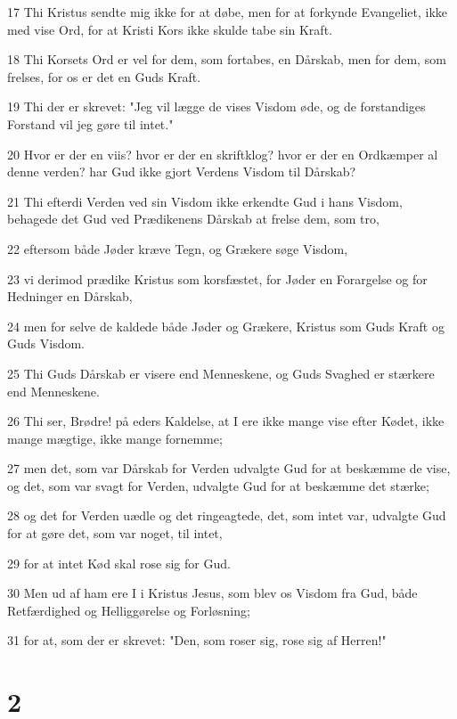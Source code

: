 \par 17 Thi Kristus sendte mig ikke for at døbe, men for at forkynde Evangeliet, ikke med vise Ord, for at Kristi Kors ikke skulde tabe sin Kraft.
\par 18 Thi Korsets Ord er vel for dem, som fortabes, en Dårskab, men for dem, som frelses, for os er det en Guds Kraft.
\par 19 Thi der er skrevet: "Jeg vil lægge de vises Visdom øde, og de forstandiges Forstand vil jeg gøre til intet."
\par 20 Hvor er der en viis? hvor er der en skriftklog? hvor er der en Ordkæmper al denne verden? har Gud ikke gjort Verdens Visdom til Dårskab?
\par 21 Thi efterdi Verden ved sin Visdom ikke erkendte Gud i hans Visdom, behagede det Gud ved Prædikenens Dårskab at frelse dem, som tro,
\par 22 eftersom både Jøder kræve Tegn, og Grækere søge Visdom,
\par 23 vi derimod prædike Kristus som korsfæstet, for Jøder en Forargelse og for Hedninger en Dårskab,
\par 24 men for selve de kaldede både Jøder og Grækere, Kristus som Guds Kraft og Guds Visdom.
\par 25 Thi Guds Dårskab er visere end Menneskene, og Guds Svaghed er stærkere end Menneskene.
\par 26 Thi ser, Brødre! på eders Kaldelse, at I ere ikke mange vise efter Kødet, ikke mange mægtige, ikke mange fornemme;
\par 27 men det, som var Dårskab for Verden udvalgte Gud for at beskæmme de vise, og det, som var svagt for Verden, udvalgte Gud for at beskæmme det stærke;
\par 28 og det for Verden uædle og det ringeagtede, det, som intet var, udvalgte Gud for at gøre det, som var noget, til intet,
\par 29 for at intet Kød skal rose sig for Gud.
\par 30 Men ud af ham ere I i Kristus Jesus, som blev os Visdom fra Gud, både Retfærdighed og Helliggørelse og Forløsning;
\par 31 for at, som der er skrevet: "Den, som roser sig, rose sig af Herren!"

\chapter{2}

